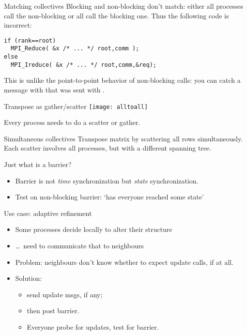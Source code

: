 \begin{numberedframe}{Matching collectives}
  \label{sl:coll-nonblock-match}
  Blocking and non-blocking don't match: either all processes
  call the non-blocking or all call the blocking one.
  Thus the following code is incorrect:
\begin{lstlisting}
if (rank==root)
  MPI_Reduce( &x /* ... */ root,comm );
else
  MPI_Ireduce( &x /* ... */ root,comm,&req);
\end{lstlisting}
  This is unlike the point-to-point behavior of non-blocking calls:
  you can catch a message with 
  that was sent with .
\end{numberedframe}

\begin{numberedframe}{Transpose as gather/scatter}
  \texttt{[image: alltoall]}

  Every process needs to do a scatter or gather.
\end{numberedframe}

\begin{numberedframe}{Simultaneous collectives}
  Transpose matrix by scattering all rows simultaneously.\\
  Each scatter involves all processes, but with a
  different spanning tree.

\end{numberedframe}


\begin{numberedframe}{Just what is a barrier?}
  \begin{itemize}
  \item Barrier is not \emph{time} synchronization but \emph{state}
    synchronization.
  \item Test on non-blocking barrier: `has everyone reached some
    state'
  \end{itemize}
\end{numberedframe}

\begin{numberedframe}{Use case: adaptive refinement}
  \begin{itemize}
  \item Some processes decide locally to alter their structure
  \item \ldots~need to communicate that to neighbours
  \item Problem: neighbours don't know whether to expect update calls,
    if at all.
  \item Solution:
    \begin{itemize}
    \item send update msgs, if any;
    \item then post barrier.
    \item Everyone probe for updates, test for barrier.    
    \end{itemize}
  \end{itemize}
\end{numberedframe}

